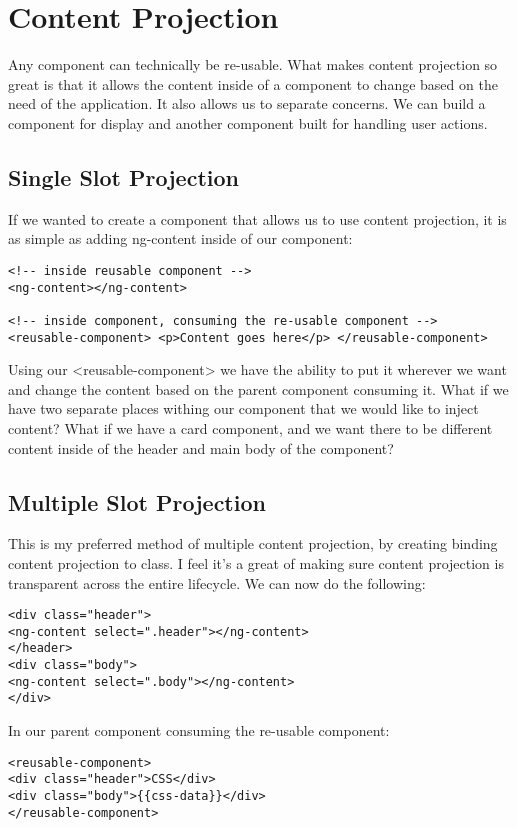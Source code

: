 \chapter{ Content Projection }

Any component can technically be re-usable. What makes content projection so great is that it allows the content inside of a component to change based on the need of the application. It also allows us to separate concerns. We can build a component for display and another component built for handling user actions.

\section{ Single Slot Projection }
If we wanted to create a component that allows us to use content projection, it is as simple as adding ng-content inside of our component:
\begin{lstlisting}
<!-- inside reusable component -->
<ng-content></ng-content>

<!-- inside component, consuming the re-usable component -->
<reusable-component> <p>Content goes here</p> </reusable-component>
\end{lstlisting}

Using our <reusable-component> we have the ability to put it wherever we want and change the content based on the parent component consuming it. What if we have two separate places withing our component that we would like to inject content? What if we have a card component, and we want there to be different content inside of the header and main body of the component?

\section{ Multiple Slot Projection }
This is my preferred method of multiple content projection, by creating binding content projection to class. I feel it's a great of making sure content projection is transparent across the entire lifecycle. We can now do the following:

\begin{lstlisting}
<div class="header">
<ng-content select=".header"></ng-content>
</header>
<div class="body">
<ng-content select=".body"></ng-content>
</div>
\end{lstlisting}

In our parent component consuming the re-usable component:
\begin{lstlisting}
<reusable-component>
<div class="header">CSS</div>
<div class="body">{{css-data}}</div>
</reusable-component>
\end{lstlisting}

